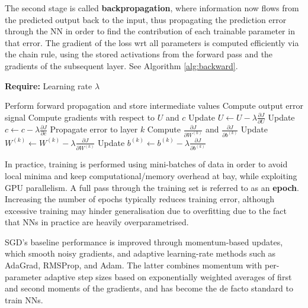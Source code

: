 The second stage is called \textbf{backpropagation}, where information now flows from the predicted output back to the input, thus propagating the prediction error through the NN in order to find the contribution of each trainable parameter in that error. The gradient of the loss wrt all parameters is computed efficiently via the chain rule, using the stored activations from the forward pass and the gradients of the subsequent layer. See Algorithm \ref{alg:backward}.

\begin{algorithm}[H]
	\caption{Backward Propagation}
    \label{alg:backward}
	\textbf{Require:} Learning rate $\lambda$
	\begin{algorithmic}[1]
		\State Perform forward propagation and store intermediate values
		\State Compute output error signal
		\State Compute gradients with respect to $U$ and $c$
		\State Update $U \gets U - \lambda \frac{\partial J}{\partial U}$
		\State Update $c \gets c - \lambda \frac{\partial J}{\partial c}$
			\State Propagate error to layer $k$
			\State Compute $\frac{\partial J}{\partial W^{(k)}}$ and $\frac{\partial J}{\partial b^{(k)}}$
			\State Update $W^{(k)} \gets W^{(k)} - \lambda \frac{\partial J}{\partial W^{(k)}}$
			\State Update $b^{(k)} \gets b^{(k)} - \lambda \frac{\partial J}{\partial b^{(k)}}$
		\EndFor
	\end{algorithmic}
\end{algorithm}

In practice, training is performed using mini-batches of data in order to avoid local minima and keep computational/memory overhead at bay, while exploiting GPU parallelism. A full pass through the training set is referred to as an \textbf{epoch}. Increasing the number of epochs typically reduces training error, although excessive training may hinder generalisation due to overfitting due to the fact that NNs in practice are heavily overparametrised.


\begin{remark}
SGD's baseline performance is improved through momentum-based updates, which smooth noisy gradients, and adaptive learning-rate methods such as AdaGrad, RMSProp, and Adam. The latter combines momentum with per-parameter adaptive step sizes based on exponentially weighted averages of first and second moments of the gradients, and has become the de facto standard to train NNs.
\end{remark}

